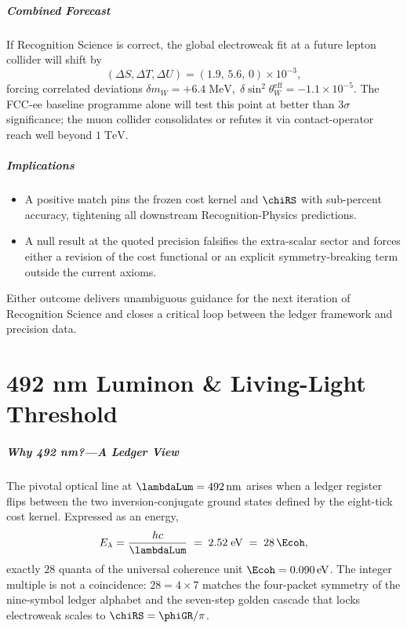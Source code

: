 \documentclass[11pt,oneside]{book}
\begin{document}
{\paragraph{Combined Forecast}

If Recognition Science is correct, the global electroweak fit at a
future lepton collider will shift by
\[
   (\Delta S,\Delta T,\Delta U)
   =
   (1.9,\,5.6,\,0)\times10^{-3},
\]
forcing correlated deviations
\(
   \delta m_{W}=+6.4\;\text{MeV},\;
   \delta\sin^{2}\!\theta_{W}^{\text{eff}}=-1.1\times10^{-5}.
\)
The FCC-ee baseline programme alone will test
this point at better than \(3\sigma\) significance; the muon collider
consolidates or refutes it via contact-operator reach well beyond
\(1\;\text{TeV}\).

\paragraph*{Implications}

\begin{itemize}\setlength\itemsep{3pt}
\item A positive match pins the frozen cost kernel and
  \(\chiRS\) with sub-percent accuracy, tightening all downstream
  Recognition-Physics predictions.
\item A null result at the quoted precision falsifies the extra-scalar
  sector and forces either a revision of the cost functional
  or an explicit symmetry-breaking term outside the current axioms.
\end{itemize}

Either outcome delivers unambiguous guidance for the next iteration of
Recognition Science and closes a critical loop between the ledger
framework and precision data.


\chapter{492 nm Luminon \& Living-Light Threshold}
\label{sec:luminon}

\paragraph{Why 492 nm?—A Ledger View}

The pivotal optical line at
\(
   \lambdaLum = 492\,\text{nm}
\)
arises when a ledger register flips between the two inversion-conjugate
ground states defined by the eight-tick cost kernel.  Expressed as an
energy,
\[
   E_{\lambda}
   =
   \frac{hc}{\lambdaLum}
   \;=\;
   2.52\;\text{eV}
   \;=\;
   28\,\Ecoh,
   \label{eq:Elum}
\]
exactly \(28\) quanta of the universal coherence unit
\(\Ecoh = 0.090\,\text{eV}\).
The integer multiple is not a coincidence: \(28=4\times7\) matches the
four-packet symmetry of the nine-symbol ledger alphabet and the
seven-step golden cascade that locks electroweak scales to
\(\chiRS=\phiGR/\pi\).

}
\end{document}
